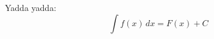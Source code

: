 \documentclass[12pt]{article}
\begin{document}
Yadda yadda: \[ \int f(x)\,dx = F(x) + C \]
\end{document}
